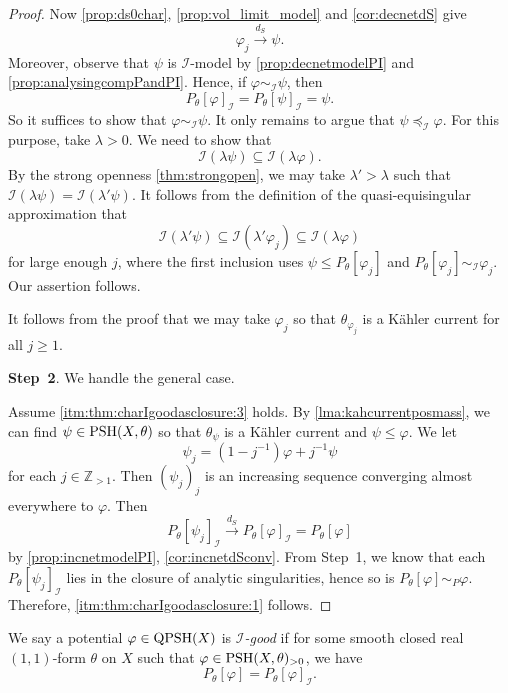 \begin{proof}
Now \cref{prop:ds0char}, \cref{prop:vol_limit_model} and
\cref{cor:decnetdS} give
\[
    \varphi_j\xrightarrow{d_S}\psi.
\]
Moreover, observe that $\psi$ is $\mathcal{I}$-model by \cref{prop:decnetmodelPI} and \cref{prop:analysingcompPandPI}. Hence, if $\varphi\sim_{\mathcal I}\psi$, then
\[
    P_\theta[\varphi]_{\mathcal I}=P_\theta[\psi]_{\mathcal I}=\psi.
\]
So it suffices to show that $\varphi\sim_{\mathcal I}\psi$.
It only remains to argue that $\psi \preceq_{\mathcal{I}} \varphi$. For this purpose, take $\lambda>0$. We need to show that
    \[
        \mathcal{I}(\lambda \psi)\subseteq \mathcal{I}(\lambda \varphi).
    \]
    By the strong openness \cref{thm:strongopen}, we may take $\lambda'>\lambda$ such that $\mathcal{I}(\lambda \psi)=\mathcal{I}(\lambda' \psi)$. It follows from the definition of the quasi-equisingular approximation that
    \[
        \mathcal{I}(\lambda'\psi)\subseteq \mathcal{I}(\lambda'\varphi_j)\subseteq \mathcal{I}(\lambda\varphi)
    \]
    for large enough $j$, where the first inclusion uses $\psi\leq P_\theta[\varphi_j]$ and $P_\theta[\varphi_j]\sim_{\mathcal{I}}\varphi_j$. Our assertion follows.

    It follows from the proof that we may take $\varphi_j$ so that $\theta_{\varphi_j}$ is a K\"ahler current for all $j\geq 1$.

    \textbf{Step~2}. We handle the general case.

    Assume \ref{itm:thm:charIgoodasclosure:3} holds.
    By \cref{lma:kahcurrentposmass}, we can find $\psi\in \mathrm{PSH}(X,\theta)$ so that $\theta_{\psi}$ is a Kähler current and $\psi\leq \varphi$. We let
    \[
        \psi_j=(1-j^{-1})\varphi+j^{-1}\psi
    \]
    for each $j\in \mathbb{Z}_{>1}$. Then $(\psi_j)_j$ is an increasing sequence converging almost everywhere to $\varphi$.
    Then
    \[
    P_{\theta}[\psi_j]_{\mathcal{I}}\xrightarrow{d_S}P_{\theta}[\varphi]_{\mathcal{I}}=P_{\theta}[\varphi]
    \]
    by \cref{prop:incnetmodelPI}, \cref{cor:incnetdSconv}.
    From Step~1, we know that each $P_{\theta}[\psi_j]_{\mathcal{I}}$ lies in the closure of analytic singularities, hence so is $P_{\theta}[\varphi]\sim_P \varphi$. Therefore, \ref{itm:thm:charIgoodasclosure:1} follows.
\end{proof}


\begin{definition}\label{def:Igoodpot}
    We say a potential $\varphi\in \mathrm{QPSH}(X)$ is \emph{$\mathcal{I}$-good} if for some smooth closed real $(1,1)$-form $\theta$ on $X$ such that $\varphi\in \mathrm{PSH}(X,\theta)_{>0}$, we have
    \begin{equation}\label{eq:envelopeeq}
    P_{\theta}[\varphi]=P_{\theta}[\varphi]_{\mathcal{I}}.
    \end{equation}
\end{definition}


